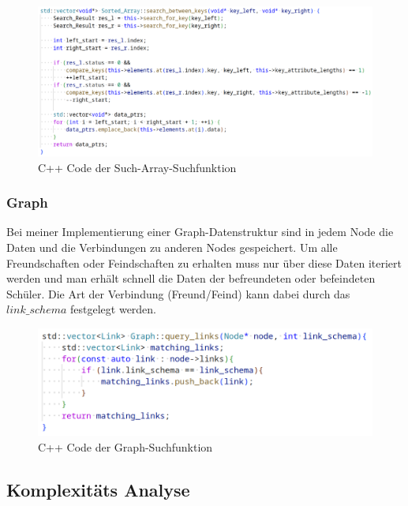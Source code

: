 \documentclass[11pt,a4paper]{article}
\begin{document}
\begin{figure}[H]
    \centering
    \includegraphics[width=1.1\textwidth]{./res/code_sort_array.png}
    \caption{C++ Code der Such-Array-Suchfunktion}
\end{figure}

\subsubsection{Graph}

Bei meiner Implementierung einer Graph-Datenstruktur sind in jedem Node
die Daten und die Verbindungen zu anderen Nodes gespeichert.
Um alle Freundschaften oder Feindschaften zu erhalten muss nur über diese
Daten iteriert werden und man erhält schnell die Daten der befreundeten oder
befeindeten Schüler. Die Art der Verbindung (Freund/Feind) kann dabei durch
das $link\_schema$ festgelegt werden.

\vspace*{0.5cm}

\begin{figure}[H]
    \centering
    \includegraphics[width=1.0\textwidth]{./res/code_graphdb.png}
    \caption{C++ Code der Graph-Suchfunktion}
\end{figure}

\subsection{Komplexitäts Analyse}
\end{document}
